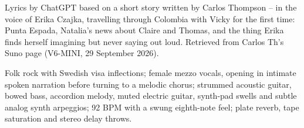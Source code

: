 
\begin{notes}
Lyrics by ChatGPT based on a short story written by Carlos Thompson -- in the voice of Erika Czajka, travelling through Colombia with Vicky for the first time: Punta Espada, Natalia's news about Claire and Thomas, and the thing Erika finds herself imagining but never saying out loud. Retrieved from Carlos Th's Suno page (V6-MINI, 29 September 2026).
\end{notes}
\begin{style}
Folk rock with Swedish visa inflections; female mezzo vocals, opening in intimate spoken narration before turning to a melodic chorus; strummed acoustic guitar, bowed bass, accordion melody, muted electric guitar, synth-pad swells and subtle analog synth arpeggios; 92 BPM with a swung eighth-note feel; plate reverb, tape saturation and stereo delay throws.
\end{style}
